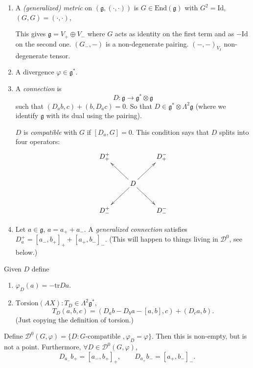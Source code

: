 \medskip\noindent
\begin{definition}
\label{definition-generalizaed}
\begin{enumerate}
\item A {\it (generalized) metric} on $(\mathfrak{g},(\cdot,\cdot))$ is
$G \in \text{End}(\mathfrak{g})$ with $G^2=\text{Id}$, $(G,G)=(\cdot,\cdot)$,

This gives $\mathfrak{g}=V_+ \oplus V_-$ where $G$ acts as identity on the
first term and as $-\text{Id}$ on the second one.
$(G_-,-)$ is a non-degenerate pairing.
$(-,-)_{V_I}$ non-degenerate tensor.

\item A divergence $\varphi \in \mathfrak{g} ^*$.

\item A {\it connection} is 
$$
D: \mathfrak{g} \to \mathfrak{g}^* \otimes \mathfrak{g}
$$
such that $(D_ab,c)+(b,D_ac)=0$.
So that $D \in \mathfrak{g}^*  \otimes \Lambda^{2}\mathfrak{g}$ 
(where we identify $\mathfrak{g}$ with its dual using the pairing).

$D$ is  {\it compatible} with $G$ if
$[D_a,G]=0$. This condition says that $D$ splits into four operators:
$$
\xymatrix{
D^+_+&  &  D_+^-\\
&  D\ar[ul]\ar[ur]\ar[dl]\ar[dr]\\
D^+_-& & D_-^-
}
$$
\item  Let $a \in \mathfrak{g}$, $a=a_++a_-$.
A {\it generalized connection} satisfies
$D_a^+=[a_-,b_+]_+ +[a_+,b_-]_-$. (This will happen to things
living in $\mathcal{D}^0$, see below.)
\end{enumerate}
\end{definition}

\begin{definition}
\label{definition-}
Given $D$ define
\begin{enumerate}
\item $\varphi_D(a)=-\text{tr}Da$.
\item $\text{Torsion}(AX):T_D \in \Lambda^{2}\mathfrak{g}^*$,
$$
T_D(a,b,c)=(D_ab-D_ba-[a,b],c)+(D_ca,b).
$$
(Just copying the definition of torsion.)
\end{enumerate}
\end{definition}

\begin{lemma}
\label{lemma-}
Define $\mathcal{D}^0(G,\varphi)=\{D:G\text{-compatible }, \varphi_D=\varphi\}$.
Then this is non-empty, but is not a point.
Furthermore, $\forall  D \in \mathcal{D}^0(G,\varphi)$,
$$
D_{a_-}b_+=[a_-,b_+]_+,\qquad 
D_{a_+}b_-=[a_+,b_-]_-.
$$
\end{lemma}

